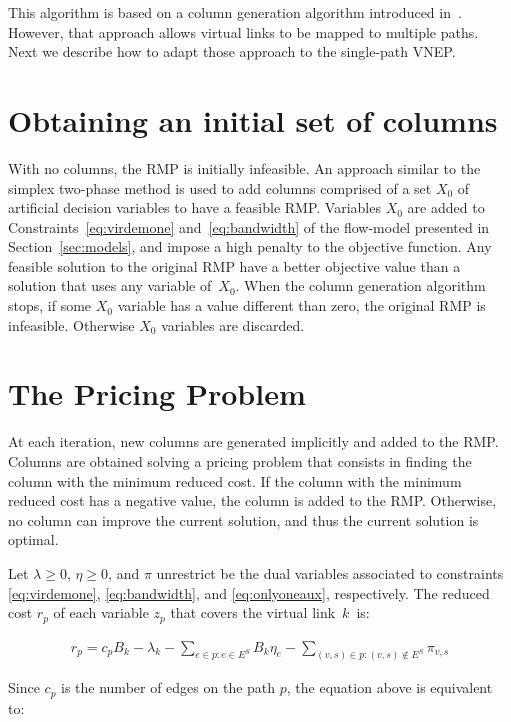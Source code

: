 This algorithm is based on a column generation algorithm introduced in~\cite{hu:2013}.
However, that approach allows virtual links to be mapped to multiple paths.
Next we describe how to adapt those approach to the single-path VNEP.

\section{Obtaining an initial set of columns}
\label{sec:initcol}
With no columns, the RMP is initially infeasible. %
An approach similar to the simplex two-phase method is used to add columns comprised of a set $X_0$ of artificial decision variables to have a feasible RMP. Variables $X_0$ are added to Constraints~\eqref{eq:virdemone} and~\eqref{eq:bandwidth} of the flow-model presented in Section~\ref{sec:models}, and impose a high penalty to the objective function. %
Any feasible solution to the original RMP have a better objective value than a solution that uses any variable of~$X_0$. 
When the column generation algorithm stops, if some $X_0$ variable has a value different than zero, the original RMP is infeasible. Otherwise $X_0$ variables are discarded.

\section{The Pricing Problem}
\label{sec:pricing}
At each iteration, new columns are generated implicitly and added to the RMP.
Columns are obtained solving a pricing problem that consists in finding the column with the minimum reduced cost.
If the column with the minimum reduced cost has a negative value, the column is added to the RMP. Otherwise, no column can improve the current solution, and thus the current solution is optimal.

Let $\lambda \geq 0$, $\eta \geq 0$, and  $\pi$ unrestrict be the dual variables associated to constraints \eqref{eq:virdemone}, \eqref{eq:bandwidth}, and \eqref{eq:onlyoneaux}, respectively. The reduced cost $r_{p}$ of each variable $z_{p}$ that covers the virtual link~$k$~is:

\begin{align}
  r_{p} = c_{p} B_{k} - \lambda_{k} - \sum\limits_{e \in p : e \in E^S} B_{k} \eta_{e}  - \sum\limits_{(v,s) \in p : (v,s) \notin E^S} \pi_{v,s}  \nonumber
\end{align}

Since $c_p$ is the number of edges on the path $p$, the equation above is equivalent to:

